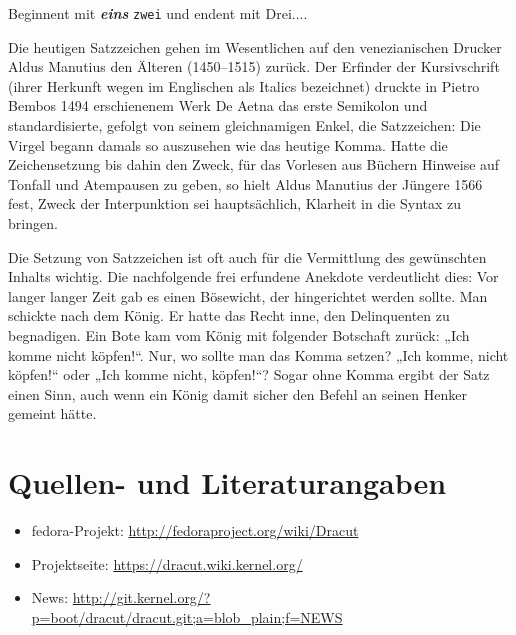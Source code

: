\documentclass[10pt,a4paper]{article}
\newcommand{\doppelt}[2]{\textit{\textbf{#1}} \texttt{#2}}
\begin{document}
Beginnent mit \doppelt{eins}{zwei} und endent mit Drei....

Die heutigen Satzzeichen gehen im Wesentlichen auf den venezianischen Drucker
Aldus Manutius den Älteren (1450–1515) zurück. Der Erfinder der Kursivschrift
(ihrer Herkunft wegen im Englischen als Italics bezeichnet) druckte in Pietro
Bembos 1494 erschienenem Werk De Aetna das erste Semikolon und standardisierte,
gefolgt von seinem gleichnamigen Enkel, die Satzzeichen: Die Virgel begann
damals so auszusehen wie das heutige Komma. Hatte die Zeichensetzung bis dahin
den Zweck, für das Vorlesen aus Büchern Hinweise auf Tonfall und Atempausen zu
geben, so hielt Aldus Manutius der Jüngere 1566 fest, Zweck der Interpunktion
sei hauptsächlich, Klarheit in die Syntax zu bringen.


Die Setzung von Satzzeichen ist oft auch für die Vermittlung des gewünschten
Inhalts wichtig. Die nachfolgende frei erfundene Anekdote verdeutlicht dies:
Vor langer langer Zeit gab es einen Bösewicht, der hingerichtet werden sollte.
Man schickte nach dem König. Er hatte das Recht inne, den Delinquenten zu
begnadigen. Ein Bote kam vom König mit folgender Botschaft zurück: „Ich
komme nicht köpfen!“. Nur, wo sollte man das Komma setzen? „Ich komme, nicht
köpfen!“ oder „Ich komme nicht, köpfen!“? Sogar ohne Komma ergibt der Satz
einen Sinn, auch wenn ein König damit sicher den Befehl an seinen Henker
gemeint hätte.


\section{Quellen- und Literaturangaben}
\label{sec:quell}

\begin{itemize}
 \item fedora-Projekt: \url{http://fedoraproject.org/wiki/Dracut}
 \item Projektseite: \url{https://dracut.wiki.kernel.org/}
 \item News: \url{http://git.kernel.org/?p=boot/dracut/dracut.git;a=blob_plain;f=NEWS}
\end{itemize}
\end{document}
